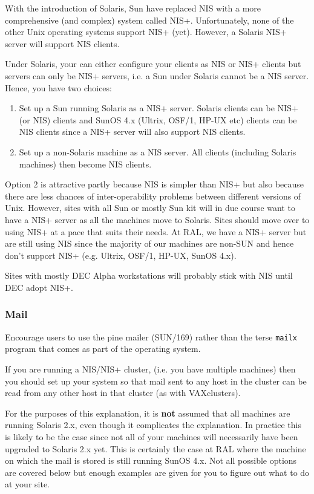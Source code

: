 With the introduction of Solaris, Sun have replaced NIS with a more
comprehensive (and complex) system called NIS+. Unfortunately, none
of the other Unix operating systems support NIS+ (yet). However, a
Solaris NIS+ server will support NIS clients.

Under Solaris, your can either configure your clients as NIS or NIS+
clients but servers can only be NIS+ servers, i.e. a Sun under Solaris
cannot be a NIS server. Hence, you have two choices:

\begin{enumerate}

\item Set up a Sun running Solaris as a NIS+ server. Solaris clients can be
NIS+ (or NIS) clients and SunOS 4.x (Ultrix, OSF/1, HP-UX etc) clients can be
NIS clients since a NIS+ server will also support NIS clients.

\item Set up a non-Solaris machine as a NIS server. All clients (including
Solaris machines) then become NIS clients.

\end{enumerate}

Option 2 is attractive partly because NIS is simpler than NIS+ but also
because there are less chances of inter-operability problems between different
versions of Unix. However, sites with all Sun or mostly Sun kit will in due
course want to have a NIS+ server as all the machines move to Solaris. Sites
should move over to using NIS+ at a pace that suits their needs.
At RAL, we have a NIS+ server but are still using NIS since the majority of
our machines are non-SUN and hence don't support NIS+ (e.g. Ultrix, OSF/1,
HP-UX, SunOS 4.x).


Sites with mostly DEC Alpha workstations will probably stick with NIS
until DEC adopt NIS+.

\subsubsection{Mail}

Encourage users to use the pine mailer (SUN/169) rather than the terse
\verb+mailx+ program that comes as part of the operating system.

If you are running a NIS/NIS+ cluster, (i.e. you have multiple machines)
then you should set up your system so that
mail sent to any host in the cluster can be read from any other host in that
cluster (as with VAXclusters).

For the purposes of this explanation, it is {\bf not} assumed that all machines
are running Solaris 2.x, even though it complicates the explanation.
In practice this is likely to be the case since not
all of your machines will necessarily have been upgraded to Solaris 2.x yet.
This is certainly the case at RAL where the machine on which the mail is stored
is still running SunOS 4.x. Not all possible options are covered below but
enough examples are given for you to figure out what to do at your site.

